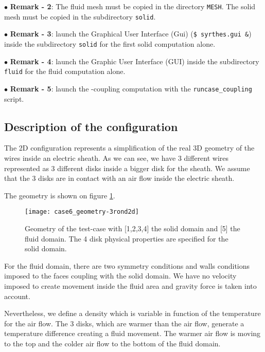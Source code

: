 $\bullet$ {\bf Remark - 2}:  The fluid mesh must be copied in the directory \texttt{MESH}.
The solid mesh must be copied in the subdirectory \texttt{solid}.

$\bullet$ {\bf Remark - 3}: launch the \syrthes Graphical User Interface (Gui)
(\texttt{\$ {\color{blue}syrthes.gui \&}}) inside the subdirectory \texttt{solid} for the first
solid computation alone.

$\bullet$ {\bf Remark - 4}: launch the \CS Graphic User Interface (GUI) inside the
subdirectory \texttt{fluid} for the fluid computation alone.

$\bullet$ {\bf Remark - 5}: launch the \CS-\syrthes coupling computation with the
\texttt{{\color{blue}runcase\_coupling}} script.

        \subsection{Description of the configuration}

The 2D configuration represents a simplification of the real 3D geometry of the wires inside an electric sheath.
As we can see, we have 3 different wires represented as 3 different disks inside a bigger disk for the sheath.
We assume that the 3 disks are in contact with an air flow inside the electric sheath.

The geometry is shown on figure \ref{config}.


\begin{figure}[h!]
\begin{center}
\texttt{[image: case6\_geometry-3rond2d]}
\caption{Geometry of the test-case with [1,2,3,4] the solid domain and [5] the fluid domain.
The 4 disk physical properties are specified for the solid domain.}
\label{config}
\end{center}
\end{figure}

For the fluid domain, there are two symmetry conditions and walls conditions imposed to the faces coupling with
the solid domain. We have no velocity imposed to create movement inside the fluid area
and gravity force is taken into account.

Nevertheless, we define a density which is variable in function of the temperature for the air flow.
The 3 disks, which are warmer than the air flow, generate a temperature difference creating a fluid movement.
The warmer air flow is moving to the top and the colder air flow to the bottom of the fluid domain.

